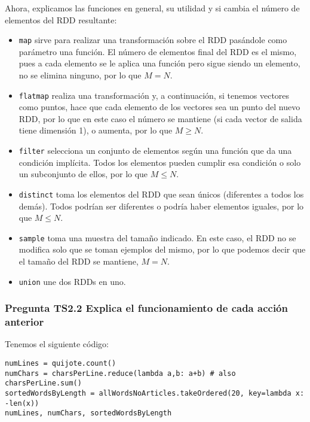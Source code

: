 \documentclass[11pt]{article}
\def\inline{\lstinline[basicstyle=\ttfamily,keywordstyle={}]}
\begin{document}
Ahora, explicamos las funciones en general, su utilidad y si cambia el número de elementos del RDD resultante:

\begin{itemize}
	\item \inline{map} sirve para realizar una transformación sobre el RDD pasándole como parámetro una función. El número de elementos final del RDD es el mismo, pues a cada elemento se le aplica una función pero sigue siendo un elemento, no se elimina ninguno, por lo que $M=N$.
	
	\item \inline{flatmap} realiza una transformación y, a continuación, si tenemos vectores como puntos, hace que cada elemento de los vectores sea un punto del nuevo RDD, por lo que en este caso el número se mantiene (si cada vector de salida tiene dimensión 1), o aumenta, por lo que $M \geq N$.
	
	\item \inline{filter} selecciona un conjunto de elementos según una función que da una condición implícita. Todos los elementos pueden cumplir esa condición o solo un subconjunto de ellos, por lo que $M \leq N$.
	
	\item \inline{distinct} toma los elementos del RDD que sean únicos (diferentes a todos los demás). Todos podrían ser diferentes o podría haber elementos iguales, por lo que $M \leq N$.
	
	\item \inline{sample} toma una muestra del tamaño indicado. En este caso, el RDD no se modifica solo que se toman ejemplos del mismo, por lo que podemos decir que el tamaño del RDD se mantiene, $M=N$.
	
	\item \inline{union} une dos RDDs en uno.
\end{itemize}

\subsubsection*{ Pregunta TS2.2 Explica el funcionamiento de cada acción anterior }

Tenemos el siguiente código:

\begin{verbatim}
numLines = quijote.count()
numChars = charsPerLine.reduce(lambda a,b: a+b) # also charsPerLine.sum()
sortedWordsByLength = allWordsNoArticles.takeOrdered(20, key=lambda x: -len(x))
numLines, numChars, sortedWordsByLength
\end{verbatim}
\end{document}
